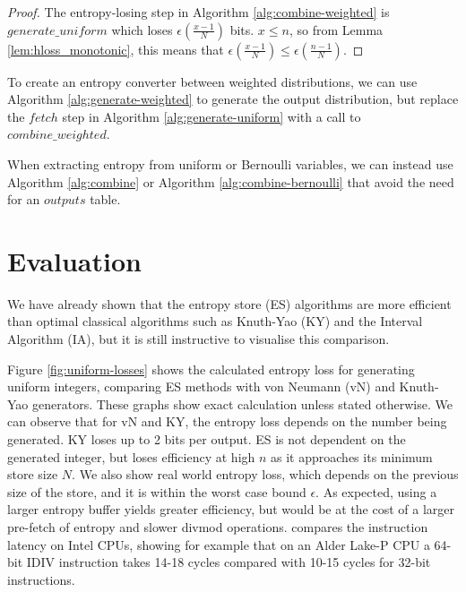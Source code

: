\documentclass[12pt]{article}
\begin{document}
\begin{proof}
    The entropy-losing step in Algorithm \ref{alg:combine-weighted} is $generate\_uniform$ which loses $\epsilon(\frac{x-1}{N})$ bits. $x \le n$, so from Lemma \ref{lem:hloss_monotonic}, this means that $\epsilon(\frac{x-1}{N}) \le \epsilon(\frac{n-1}{N})$.
\end{proof}

To create an entropy converter between weighted distributions, we can use Algorithm \ref{alg:generate-weighted} to generate the output distribution, but replace the $fetch$ step in Algorithm \ref{alg:generate-uniform} with a call to $combine\_weighted$.

When extracting entropy from uniform or Bernoulli variables, we can instead use Algorithm \ref{alg:combine} or Algorithm \ref{alg:combine-bernoulli} that avoid the need for an $outputs$ table.



\section {Evaluation}

We have already shown that the entropy store (ES) algorithms are more efficient than optimal classical algorithms such as Knuth-Yao (KY) and the Interval Algorithm (IA), but it is still instructive to visualise this comparison.

Figure \ref{fig:uniform-losses} shows the calculated entropy loss for generating uniform integers, comparing ES methods with von Neumann (vN) and Knuth-Yao generators. These graphs show exact calculation unless stated otherwise. We can observe that for vN and KY, the entropy loss depends on the number being generated. KY loses up to 2 bits per output. ES is not dependent on the generated integer, but loses efficiency at high $n$ as it approaches its minimum store size $N$. We also show real world entropy loss, which depends on the previous size of the store, and it is within the worst case bound $\epsilon$. As expected, using a larger entropy buffer yields greater efficiency, but would be at the cost of a larger pre-fetch of entropy and slower divmod operations. \cite{Abel19a} compares the instruction latency on Intel CPUs, showing for example that on an Alder Lake-P CPU a 64-bit IDIV instruction takes 14-18 cycles compared with 10-15 cycles for 32-bit instructions.
\end{document}
